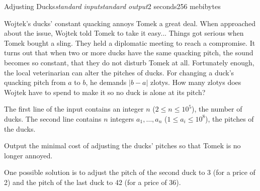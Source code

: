\begin{problem}{Adjusting Ducks}{\textsl{standard input}}{\textsl{standard output}}{2 seconds}{256 mebibytes}{}

Wojtek's ducks' constant quacking annoys Tomek a great deal.
When approached about the issue, Wojtek told Tomek to take it easy...
Things got serious when Tomek bought a sling.
They held a diplomatic meeting to reach a compromise.
It turns out that when two or more ducks have the same quacking pitch, the sound becomes so constant, that they do not disturb Tomek at all.
Fortunately enough, the local veterinarian can alter the pitches of ducks.
For changing a duck's quacking pitch from $a$ to $b$, he demands $|b - a|$ zlotys.
How many zlotys does Wojtek have to spend to make it so no duck is alone at its pitch?

\InputFile
    The first line of the input contains an integer $n$ ($2 \leq n \leq 10^5$), the number of ducks.
	 The second line contains $n$ integers $a_1, \ldots, a_n$ ($1 \leq a_i \leq 10^8$), the pitches of the ducks.

\OutputFile
	Output the minimal cost of adjusting the ducks' pitches so that Tomek is no longer annoyed.

\Examples
\begin{example}
%
\end{example}

\Note

One possible solution is to adjust the pitch of the second duck to 3 (for a price of 2) and the pitch of the last duck to 42 (for a price of 36).

\end{problem}
